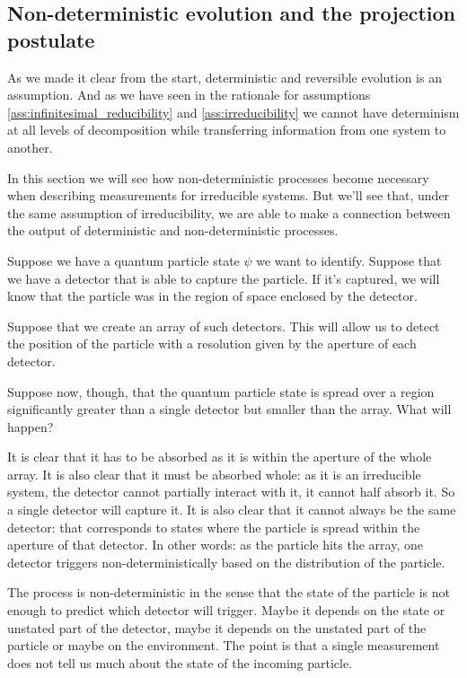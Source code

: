 \documentclass[smallextended]{svjour3}
\numberwithin{equation}{section}
\theoremstyle{definition}
\begin{document}
\subsection{Non-deterministic evolution and the projection postulate}

As we made it clear from the start, deterministic and reversible evolution is an assumption. And as we have seen in the rationale for assumptions \ref{ass:infinitesimal_reducibility} and \ref{ass:irreducibility} we cannot have determinism at all levels of decomposition while transferring information from one system to another.

In this section we will see how non-deterministic processes become necessary when describing measurements for irreducible systems. But we'll see that, under the same assumption of irreducibility, we are able to make a connection between the output of deterministic and non-deterministic processes.

Suppose we have a quantum particle state $\psi$ we want to identify. Suppose that we have a detector that is able to capture the particle. If it's captured, we will know that the particle was in the region of space enclosed by the detector.

Suppose that we create an array of such detectors. This will allow us to detect the position of the particle with a resolution given by the aperture of each detector.

Suppose now, though, that the quantum particle state is spread over a region significantly greater than a single detector but smaller than the array. What will happen?

It is clear that it has to be absorbed as it is within the aperture of the whole array. It is also clear that it must be absorbed whole: as it is an irreducible system, the detector cannot partially interact with it, it cannot half absorb it. So a single detector will capture it. It is also clear that it cannot always be the same detector: that corresponds to states where the particle is spread within the aperture of that detector. In other words: as the particle hits the array, one detector triggers non-deterministically based on the distribution of the particle.

The process is non-deterministic in the sense that the state of the particle is not enough to predict which detector will trigger. Maybe it depends on the state or unstated part of the detector, maybe it depends on the unstated part of the particle or maybe on the environment. The point is that a single measurement does not tell us much about the state of the incoming particle.
\end{document}
